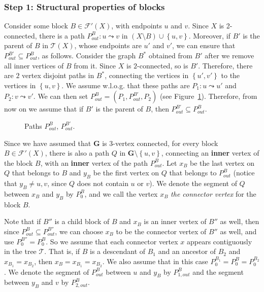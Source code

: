 \documentclass[twoside,leqno,twocolumn]{article}
\newcommand{\connect}{\leadsto}
\newcommand{\set}[1]{\left\{ #1 \right\}}
\newcommand{\sse}{\subseteq}
\newcommand{\tset}{{\mathcal T}}
\newcommand{\fset}{{\mathcal{F}}}
\newcommand{\G}{{\mathbf{G}}}
\begin{document}
\subsubsection*{Step 1: Structural properties of blocks}
Consider some block $B \in \fset'(X)$, with endpoints $u$ and $v$. Since $X$ is 2-connected, 
there is a path $P_{out}^B:u\connect v$ in $(X\setminus B)\cup\set{u,v}$.
Moreover, if $B'$ is the parent of $B$ in $\tset(X)$, whose endpoints are $u'$ and $v'$, we can ensure that $P_{out}^{B'}\sse P_{out}^B$, as follows. Consider the graph $B^*$ obtained from $B'$ after we remove all inner vertices of $B$ from it. Since $X$ is $2$-connected, so is $B'$. Therefore, there are $2$ vertex disjoint paths in $B^*$, connecting the vertices in $\set{u',v'}$ to the vertices in $\set{u,v}$. We assume w.l.o.g. that these paths are $P_1: u\connect u'$ and $P_2:v\connect v'$. We can then set $P_{out}^B=(P_1,P_{out}^{B'},P_2)$ (see Figure~\ref{fig: paths pout}). Therefore, from now on we assume that if $B'$ is the parent of $B$, then $P_{out}^{B'}\sse P_{out}^B$.



\begin{figure}[h]
\begin{center}
 \caption{Paths $P^B_{out}$, $P^{B'}_{out}$.} \label{fig: paths pout}
\end{center}
\end{figure}



Since we have assumed that $\G$ is 3-vertex connected, for every block $B\in \fset'(X)$, there is also a path $Q$ in $\G\setminus\set{u,v}$, connecting
an {\bf inner} vertex of the block $B$, with an {\bf inner} vertex of the path $P_{out}^B$. 
Let $x_B$ be the last vertex on $Q$ that belongs to $B$ and $y_B$ 
be the first vertex on $Q$ that belongs to $P^B_{out}$ (notice that $y_B\neq u,v$, since $Q$ does not contain $u$ or $v$). We denote the segment of $Q$ 
between $x_B$ and $y_B$ by $P_0^B$, and we call the vertex $x_B$ \textit{the connector vertex} for 
the block $B$. 

Note that if $B''$ is a child block of $B$ and $x_B$ is an inner vertex of $B''$ as well, then since $P_{out}^{B}\sse P_{out}^{B''}$, we can choose
$x_B$ to be the connector vertex of $B''$ as well, and use $P_0^{B''}=P_0^B$.  So we assume that each connector 
vertex $x$ appears contiguously in the tree $\tset$. That is, if $B$ is a descendant
of $B_1$ and an ancestor of $B_2$ and $x_{B_1} = x_{B_2}$, then $x_B = x_{B_1} = x_{B_2}$. We also assume that in this case $P_0^{B_1}=P_0^B=P_0^{B_2}$.
We denote the segment of $P_{out}^B$ between $u$ and $y_B$ by $P_{1,out}^B$ and the segment
between $y_B$ and $v$ by $P_{2, out}^B$. 
\end{document}

